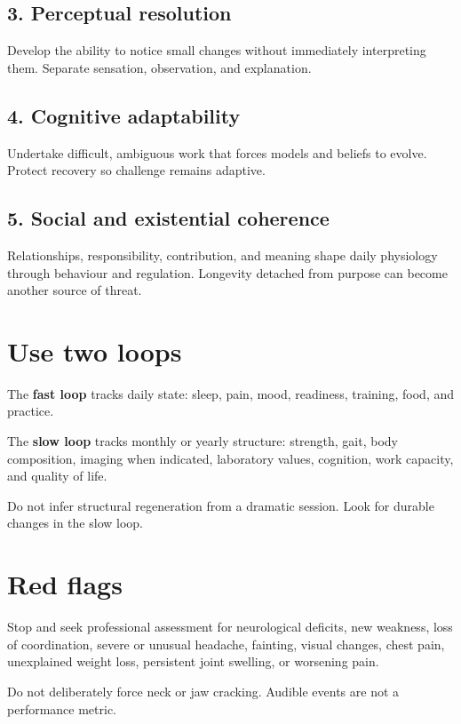 \subsection{3. Perceptual resolution}

Develop the ability to notice small changes without immediately interpreting them. Separate sensation, observation, and explanation.

\subsection{4. Cognitive adaptability}

Undertake difficult, ambiguous work that forces models and beliefs to evolve. Protect recovery so challenge remains adaptive.

\subsection{5. Social and existential coherence}

Relationships, responsibility, contribution, and meaning shape daily physiology through behaviour and regulation. Longevity detached from purpose can become another source of threat.

\section{Use two loops}

The \textbf{fast loop} tracks daily state: sleep, pain, mood, readiness, training, food, and practice.

The \textbf{slow loop} tracks monthly or yearly structure: strength, gait, body composition, imaging when indicated, laboratory values, cognition, work capacity, and quality of life.

Do not infer structural regeneration from a dramatic session. Look for durable changes in the slow loop.

\section{Red flags}

Stop and seek professional assessment for neurological deficits, new weakness, loss of coordination, severe or unusual headache, fainting, visual changes, chest pain, unexplained weight loss, persistent joint swelling, or worsening pain.

Do not deliberately force neck or jaw cracking. Audible events are not a performance metric.

